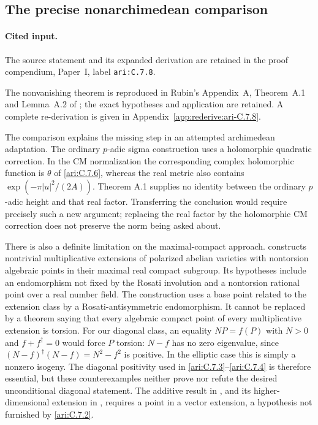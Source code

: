 \subsection{The precise nonarchimedean comparison}

\paragraph{Cited input.} \label{ari:C.7.8}The source statement and its expanded derivation are retained in the proof compendium, Paper~I, label \nolinkurl{ari:C.7.8}.\par



The nonvanishing theorem is reproduced in Rubin's Appendix~A, Theorem~A.1 and Lemma~A.2 of \citet{agboola2006}; the exact hypotheses and application are retained. A complete re-derivation is given in Appendix~\ref{app:rederive:ari-C.7.8}.


The comparison explains the missing step in an attempted
archimedean adaptation. The ordinary $p$-adic sigma construction
uses a holomorphic quadratic correction. In the CM normalization
the corresponding complex holomorphic function is $\theta$
of \ref{ari:C.7.6}, whereas the real metric also contains
$\exp(-\pi|u|^2/(2A))$. Theorem A.1 supplies no identity
between the ordinary $p$-adic height and that real factor.
Transferring the conclusion would require precisely such a
new argument; replacing the real factor by the holomorphic
CM correction does not preserve the norm being asked about.

There is also a definite limitation on the maximal-compact
approach. \citet[Theorem 2.1]{bertrand1995} constructs
nontrivial multiplicative extensions of polarized abelian
varieties with nontorsion algebraic points in their maximal
real compact subgroup. Its hypotheses include an endomorphism
not fixed by the Rosati involution and a nontorsion rational
point over a real number field. The construction uses a base
point related to the extension class by a Rosati-antisymmetric
endomorphism. It cannot be replaced by a theorem saying that
every algebraic compact point of every multiplicative
extension is torsion. For our diagonal class, an equality
$NP=f(P)$ with $N>0$ and $f+f^\dagger=0$ would force
$P$ torsion: $N-f$ has no zero eigenvalue, since
$(N-f)^\dagger(N-f)=N^2-f^2$ is positive. In the elliptic
case this is simply a nonzero isogeny. The diagonal positivity
used in \ref{ari:C.7.3}--\ref{ari:C.7.4} is therefore essential, but these
counterexamples neither prove nor refute the desired
unconditional diagonal statement. The additive result in
\citet[Theorem 3.1]{bertrand1995}, and its higher-dimensional
extension in \citet{bost2009}, requires a point in a vector
extension, a hypothesis not furnished by \ref{ari:C.7.2}.


